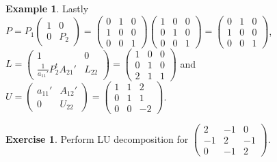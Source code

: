 \documentclass[12pt]{amsart}
\theoremstyle{definition}
\newtheorem{example}[theorem]{Example}
\newtheorem{exercise}[theorem]{Exercise}
\begin{document}
\begin{example}
Lastly $P = P_1\left(\begin{array}{cc} 1 & 0 \\ 0 & P_2 \end{array}\right) = \left(\begin{array}{ccc} 0 & 1 & 0 \\ 1 & 0 & 0 \\ 0 & 0 & 1 \end{array}\right)\left(\begin{array}{ccc} 1 & 0 & 0 \\ 0 & 1 & 0 \\ 0 & 0 &1 \end{array}\right) = \left(\begin{array}{ccc} 0 & 1 & 0 \\ 1 & 0 & 0 \\ 0 & 0 & 1 \end{array}\right)$, $L = \left(\begin{array}{cc} 1 & 0 \\ \frac{1}{a_{11}'} P^t_2 A_{21}' & L_{22}  \end{array}\right) = \left(\begin{array}{ccc} 1 & 0 & 0 \\ 0 & 1 & 0 \\ 2 & 1 & 1 \end{array}\right)$ and $ U = \left(\begin{array}{cc} a_{11}' & A_{12}' \\ 0 & U_{22} \end{array}\right) = \left(\begin{array}{ccc} 1 & 1 & 2 \\ 0 & 1 & 1\\ 0 & 0 & -2 \end{array}\right)$.
\end{example}

\begin{exercise}\label{} Perform LU decomposition for $\left(\begin{array}{ccc} 2 & -1 & 0 \\ -1 & 2 & -1 \\ 0 & -1 & 2 \end{array}\right)$.
\end{exercise}
\end{document}
